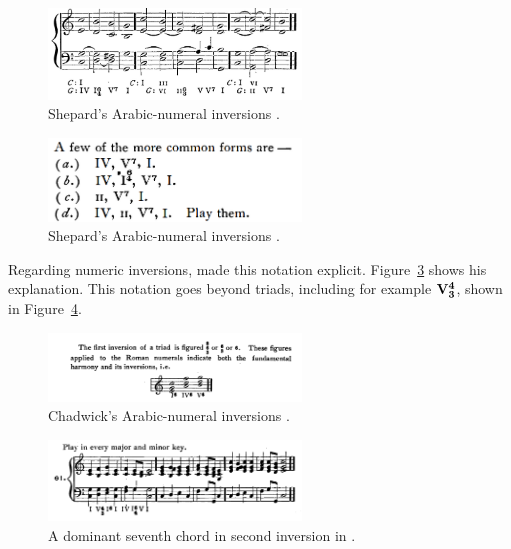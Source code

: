 \begin{figure}[h!]
    \centering
    \includegraphics[width=0.6\textwidth]{figures/chapter/2/primary_sources/shepard1896harmony184.png}
    \caption{Shepard's Arabic-numeral inversions \textcite{shepard1896harmony}.}
    \label{fig:shepard1896harmony184}
\end{figure}

\begin{figure}[h!]
    \centering
    \includegraphics[width=0.6\textwidth]{figures/chapter/2/primary_sources/shepard1896harmony117.png}
    \caption{Shepard's Arabic-numeral inversions \textcite{shepard1896harmony}.}
    \label{fig:shepard1896harmony117}
\end{figure}

Regarding numeric inversions, \textcite{chadwick1897harmony} made this notation explicit. 
Figure~\ref{fig:chadwick1897harmony012} shows his explanation.
This notation goes beyond triads, including for example 
$\textbf{V}\relax\relax{\footnotesize {}^\textbf{4}\relax_\textbf{3}\relax\relax}$, shown in Figure~\ref{fig:chadwick1897harmony028}.

\begin{figure}[h!]
    \centering
    \includegraphics[width=0.6\textwidth]{figures/chapter/2/primary_sources/chadwick1897harmony012.png}
    \caption{Chadwick's Arabic-numeral inversions \textcite{chadwick1897harmony}.}
    \label{fig:chadwick1897harmony012}
\end{figure}

\begin{figure}[h!]
    \centering
    \includegraphics[width=0.6\textwidth]{figures/chapter/2/primary_sources/chadwick1897harmony028.png}
    \caption{A dominant seventh chord in second inversion in \textcite{chadwick1897harmony}.}
    \label{fig:chadwick1897harmony028}
\end{figure}

